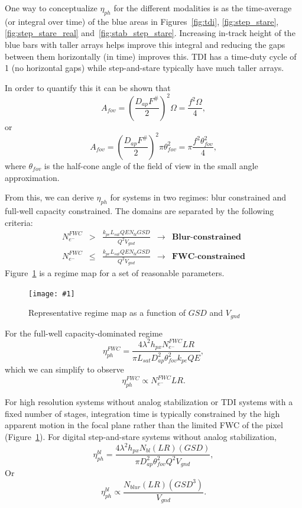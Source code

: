 \documentclass[10pt,journal]{IEEEtran}  %
\newcommand{\includefigure}[3]
{
  \begin{figure}[h!]
  \centering
  \texttt{[image: \#1]}
  \caption[]{#3}
  \label{#2}
  \end{figure}
}
\begin{document}
One way to conceptualize $\eta_{ph}$ for the different modalities is as the time-average (or integral over time) of the blue areas in Figures~\ref{fig:tdi}, \ref{fig:step_stare}, \ref{fig:step_stare_real} and~\ref{fig:stab_step_stare}.  Increasing in-track height of the blue bars with taller arrays helps improve this integral and reducing the gaps between them horizontally (in time) improves this.  TDI has a time-duty cycle of 1 (no horizontal gaps) while step-and-stare typically have much taller arrays.

In order to quantify this it can be shown that
\begin{equation*}
    A_{fov} = \left(\frac{D_{ap}F^\#}{2}\right)^2 \Omega = \frac{f^2 \Omega}{4} ,
\end{equation*}
or 
\begin{equation}
\label{eq:A_fov}
A_{fov} = \left(\frac{D_{ap}F^\#}{2}\right)^2 \pi \theta_{fov}^2 = \pi \frac{f^2 \theta_{fov}^2}{4},
\end{equation}
where $\theta_{fov}$ is the half-cone angle of the field of view in the small angle approximation.

From this, we can derive $\eta_{ph}$ for systems in two regimes: blur constrained and full-well capacity constrained.  The domains are separated by the following criteria:
\begin{align*}
    N_{e^-}^{FWC} &>& \frac{k_{pe}L_{sat}QE N_{bl} GSD}{Q^2 V_{gnd}} & \rightarrow &  \textbf{Blur-constrained} \\
    N_{e^-}^{FWC} &\leq& \frac{k_{pe}L_{sat}QE N_{bl} GSD}{Q^2 V_{gnd}} & \rightarrow &  \textbf{FWC-constrained}
\end{align*}
Figure~\ref{fig:eta_regime} is a regime map for a set of reasonable parameters.

\includefigure{figures/blur_fwc_regime.pgf}{fig:eta_regime}{Representative regime map as a function of $GSD$ and $V_{gnd}$}

For the full-well capacity-dominated regime
\begin{equation}
    \label{eq:eta_ph_fwc}
    \eta_{ph}^{FWC} = \frac{4\lambda^2 h_{px} N_{e^-}^{FWC} LR}{\pi L_{sat} D_{ap}^2 \theta_{fov}^2 k_{pe}QE},
\end{equation}
which we can simplify to observe
\begin{equation}
    \label{eq:eta_fwc_scaling}
    \eta_{ph}^{FWC} \propto N_{e^-}^{FWC} LR.
\end{equation}

For high resolution systems without analog stabilization or TDI systems with a fixed number of stages, integration time is typically constrained by the high apparent motion in the focal plane rather than the limited FWC of the pixel (Figure~\ref{fig:eta_regime}).  For digital step-and-stare systems without analog stabilization,
\begin{equation}
    \label{eq:eta_ph_blur}
    \eta_{ph}^{bl} = \frac{4\lambda^2 h_{px}N_{bl}(LR)(GSD)}{\pi D_{ap}^2\theta_{fov}^2 Q^2 V_{gnd}},
\end{equation}
Or 
\begin{equation}
    \label{eq:eta_blur_scaling}
    \eta_{ph}^{bl} \propto  \frac{N_{blur} (LR) (GSD^3)}{V_{gnd}}.
\end{equation}
\end{document}
